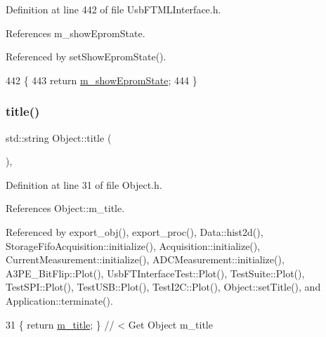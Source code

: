 Definition at line 442 of file Usb\+F\+T\+M\+L\+Interface.\+h.



References m\+\_\+show\+Eprom\+State.



Referenced by set\+Show\+Eprom\+State().


\begin{DoxyCode}
442                          \{
443     \textcolor{keywordflow}{return} \hyperlink{classUsbFTMLInterface_ac9505aba2e8a9fd9de9aed880a56a650}{m\_showEpromState};
444   \}  
\end{DoxyCode}
\mbox{\label{classObject_a73a0f1a41828fdd8303dd662446fb6c3}} 
\subsubsection{\texorpdfstring{title()}{title()}}
{\footnotesize\ttfamily std\+::string Object\+::title (\begin{DoxyParamCaption}{ }\end{DoxyParamCaption})\hspace{0.3cm}{\ttfamily [inline]}, {\ttfamily [inherited]}}



Definition at line 31 of file Object.\+h.



References Object\+::m\+\_\+title.



Referenced by export\+\_\+obj(), export\+\_\+proc(), Data\+::hist2d(), Storage\+Fifo\+Acquisition\+::initialize(), Acquisition\+::initialize(), Current\+Measurement\+::initialize(), A\+D\+C\+Measurement\+::initialize(), A3\+P\+E\+\_\+\+Bit\+Flip\+::\+Plot(), Usb\+F\+T\+Interface\+Test\+::\+Plot(), Test\+Suite\+::\+Plot(), Test\+S\+P\+I\+::\+Plot(), Test\+U\+S\+B\+::\+Plot(), Test\+I2\+C\+::\+Plot(), Object\+::set\+Title(), and Application\+::terminate().


\begin{DoxyCode}
31 \{ \textcolor{keywordflow}{return} \hyperlink{classObject_affbeea1953eb5163573b92fad8f75727}{m\_title};      \} \textcolor{comment}{// < Get Object m\_title}
\end{DoxyCode}
\mbox{\label{classHierarchy_a76e914b9a677a22a82deb74d892bf261}} 
